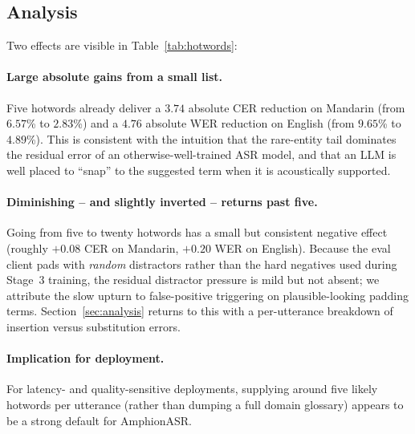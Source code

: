 \subsection{Analysis}

Two effects are visible in Table~\ref{tab:hotwords}:

\paragraph{Large absolute gains from a small list.}
Five hotwords already deliver a $3.74$ absolute CER reduction on
Mandarin (from $6.57$\% to $2.83$\%) and a $4.76$ absolute WER reduction
on English (from $9.65$\% to $4.89$\%). This is consistent with the
intuition that the rare-entity tail dominates the residual error of an
otherwise-well-trained ASR model, and that an LLM is well placed to
``snap'' to the suggested term when it is acoustically supported.

\paragraph{Diminishing -- and slightly inverted -- returns past five.}
Going from five to twenty hotwords has a small but consistent negative
effect (roughly $+0.08$ CER on Mandarin, $+0.20$ WER on English).
Because the eval client pads with \emph{random} distractors rather
than the hard negatives used during Stage~3 training, the residual
distractor pressure is mild but not absent; we attribute the slow
upturn to false-positive triggering on plausible-looking padding
terms. Section~\ref{sec:analysis} returns to this with a per-utterance
breakdown of insertion versus substitution errors.

\paragraph{Implication for deployment.}
For latency- and quality-sensitive deployments, supplying around five
likely hotwords per utterance (rather than dumping a full domain
glossary) appears to be a strong default for AmphionASR.
